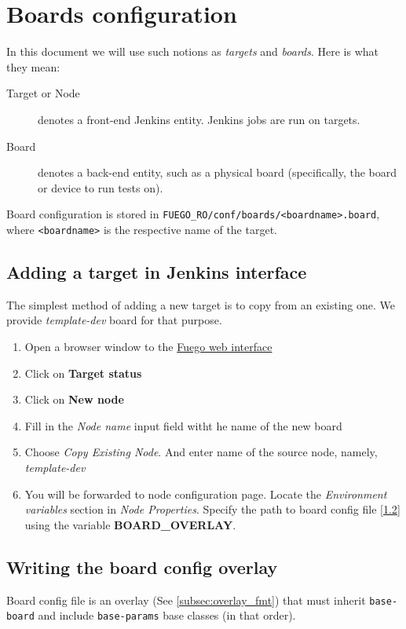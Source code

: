\section{Boards configuration}
In this document we will use such notions as \textit{targets} and \textit{boards}. Here is what they mean:
\begin{description}
\item[Target or Node] denotes a front-end Jenkins entity. Jenkins jobs are run on targets.
\item[Board] denotes a back-end entity, such as a physical board (specifically, the board or device to run tests on).
\end{description}

Board configuration is stored in \texttt{FUEGO\_RO/conf/boards/<boardname>.board},
where \texttt{<boardname>} is the respective name of the target.

\subsection{Adding a target in Jenkins interface}
\label{sec:target-add}
The simplest method of adding a new target is to copy from an existing one.
We provide \textit{template-dev} board for that purpose.
\begin{enumerate}
\item Open a browser window to the \href{http://localhost:8080/}{Fuego web interface}
\item Click on \textbf{Target status}
\item Click on \textbf{New node}
\item Fill in the \textit{Node name} input field witht he name of the new board
\item Choose \textit{Copy Existing Node}. And enter name of the source node, namely, \textit{template-dev}
\item You will be forwarded to node configuration page.
Locate the \textit{Environment variables} section in \textit{Node Properties}.
Specify the path to board config file [\ref{sec:board_config}] using the variable \textbf{BOARD\_OVERLAY}.
\end{enumerate}

\subsection{Writing the board config overlay}
\label{sec:board_config}
Board config file is an overlay (See \ref{subsec:overlay_fmt}) that must inherit \texttt{base-board} and include \texttt{base-params} base classes (in that order).

